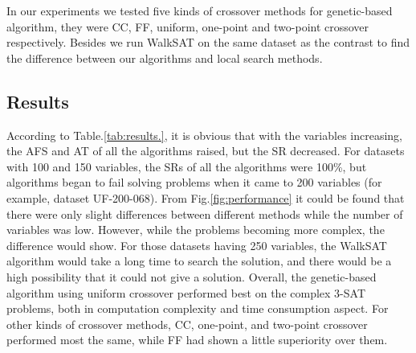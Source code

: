 In our experiments we tested five kinds of crossover methods for genetic-based algorithm, they were CC, FF, uniform, one-point and two-point crossover respectively. Besides we run WalkSAT on the same dataset as the contrast to find the difference between our algorithms and local search methods.

\subsection{Results}

According to Table.\ref{tab:results.}, it is obvious that with the variables increasing, the AFS and AT of all the algorithms raised, but the SR decreased. For datasets with 100 and 150 variables, the SRs of all the algorithms were 100\%, but algorithms began to fail solving problems when it came to 200 variables (for example, dataset UF-200-068). From Fig.\ref{fig:performance} it could be found that there were only slight differences between different methods while the number of variables was low. However, while the problems becoming more complex, the difference would show. For those datasets having 250 variables, the WalkSAT algorithm would take a long time to search the solution, and there would be a high possibility that it could not give a solution. Overall, the genetic-based algorithm using uniform crossover performed best on the complex 3-SAT problems, both in computation complexity and time consumption aspect. For other kinds of crossover methods, CC, one-point, and two-point crossover performed most the same, while FF had shown a little superiority over them.
